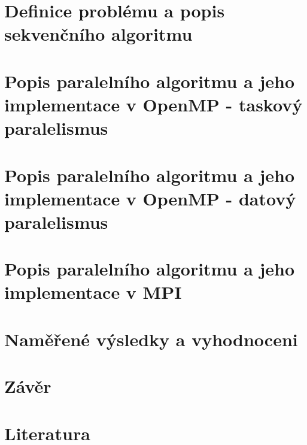 

\section{Definice problému a popis sekvenčního algoritmu}


\section{Popis paralelního algoritmu a jeho implementace v OpenMP - taskový paralelismus}


\section{Popis paralelního algoritmu a jeho implementace v OpenMP - datový paralelismus}


\section{Popis paralelního algoritmu a jeho implementace v MPI}


\section{Naměřené výsledky a vyhodnoceni}


\section{Závěr}


\section{Literatura}



